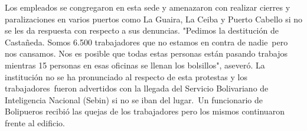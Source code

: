 \documentclass{article}%
\begin{document}
\newline%
%
Los empleados se congregaron en esta sede y amenazaron con realizar cierres y paralizaciones en varios puertos como La Guaira, La Ceiba y Puerto Cabello si no se les da respuesta con respecto a sus denuncias.%
\newline%
%
"Pedimos la destitución de Castañeda. Somos 6.500 trabajadores que no estamos en contra de nadie~pero nos cansamos. Nos es posible que todas estas personas están pasando trabajos mientras 15 personas en esas oficinas se llenan los bolsillos", aseveró.%
\newline%
%
La institución no se ha pronunciado al respecto de esta protestas y los trabajadores~fueron advertidos con la llegada del Servicio Bolivariano de Inteligencia Nacional (Sebin) si no se iban del lugar.~Un funcionario de Bolipueros recibió las quejas de los trabajadores pero los mismos continuaron frente al edificio.%
\newline%
%
\end{document}
